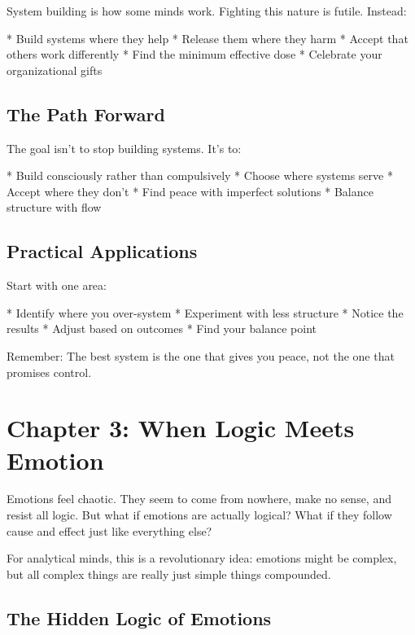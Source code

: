 \documentclass[12pt,oneside]{book}
\begin{document}
System building is how some minds work. Fighting this nature is futile. Instead:

                    * Build systems where they help
                    * Release them where they harm
                    * Accept that others work differently
                    * Find the minimum effective dose
                    * Celebrate your organizational gifts

\section{The Path Forward}

The goal isn't to stop building systems. It's to:

                    * Build consciously rather than compulsively
                    * Choose where systems serve
                    * Accept where they don't
                    * Find peace with imperfect solutions
                    * Balance structure with flow

\section{Practical Applications}

Start with one area:

                    * Identify where you over-system
                    * Experiment with less structure
                    * Notice the results
                    * Adjust based on outcomes
                    * Find your balance point

Remember: The best system is the one that gives you peace, not the one that promises control.

\chapter{Chapter 3: When Logic Meets Emotion}

Emotions feel chaotic. They seem to come from nowhere, make no sense, and resist all logic. But what if emotions are actually logical? What if they follow cause and effect just like everything else?

For analytical minds, this is a revolutionary idea: emotions might be complex, but all complex things are really just simple things compounded.

\section{The Hidden Logic of Emotions}
\end{document}
